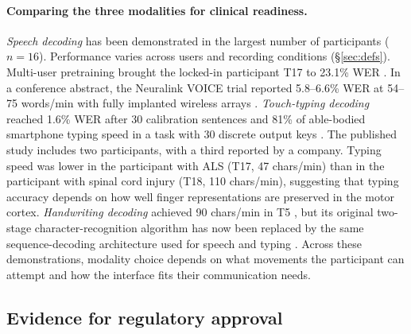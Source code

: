 \documentclass[11pt]{article}
\newcommand{\wpm}{words/min}
\newcommand{\cpm}{chars/min}
\begin{document}
\paragraph{Comparing the three modalities for clinical readiness.}
\emph{Speech decoding} has been demonstrated in the largest number of
participants ($n=16$). Performance varies across users and recording
conditions (\S\ref{sec:defs}). Multi-user pretraining brought the
locked-in participant T17 to 23.1\% WER \cite{fogg2026}. In a conference
abstract, the Neuralink VOICE trial reported 5.8--6.6\% WER at
54--75 \wpm{} with fully implanted wireless arrays
\cite{pouratian2026}. \emph{Touch-typing decoding} reached
1.6\% WER after 30 calibration sentences and 81\% of able-bodied
smartphone typing speed in a task with 30 discrete output keys
\cite{jude2026typing}. The published study includes two participants,
with a third reported by a company. Typing speed was lower in the
participant with ALS (T17, 47
\cpm{}) than in the participant with spinal cord injury (T18, 110
\cpm{}), suggesting that typing accuracy depends on how well finger
representations are preserved in the motor cortex. \emph{Handwriting
decoding} achieved 90 \cpm{} in T5 \cite{willett2021}, but its original
two-stage character-recognition algorithm has now been replaced by the
same sequence-decoding architecture used for speech and typing
\cite{levin2026}. Across these demonstrations, modality choice depends
on what movements the participant can attempt and how the interface
fits their communication needs.

\subsection{Evidence for regulatory approval}
\end{document}
